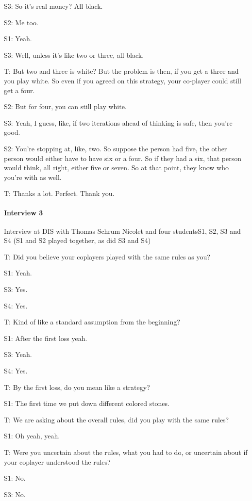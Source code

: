 S3: So it's real money? All black. 

S2: Me too.

S1: Yeah. 

S3: Well, unless it's like two or three, all black.

T: But two and three is white? But the problem is then, if you get a three and you play white. So even if you agreed on this strategy, your co-player could still get a four.

S2: But for four, you can still play white.

S3: Yeah, I guess, like, if two iterations ahead of thinking is safe, then you're good. 

S2: You're stopping at, like, two. So suppose the person had five, the other person would either have to have six or a four. So if they had a six, that person would think, all right, either five or seven. So at that point, they know who you're with as well. 

T: Thanks a lot. Perfect. Thank you.


\bigskip
\paragraph{Interview 3}
Interview at DIS with Thomas Schrum Nicolet and four studentsS1, S2, S3 and S4 (S1 and S2 played together, as did S3 and S4)

\medskip
T: Did you believe your coplayers played with the same rules as you?

S1: Yeah.

S3: Yes.

S4: Yes.

T: Kind of like a standard assumption from the beginning?

S1: After the first loss yeah.

S3: Yeah.

S4: Yes.

T: By the first loss, do you mean like a strategy?

S1: The first time we put down different colored stones.

T: We are asking about the overall rules, did you play with the same rules?

S1: Oh yeah, yeah.

T: Were you uncertain about the rules, what you had to do, or uncertain about if your coplayer understood the rules?

S1: No.

S3: No.

